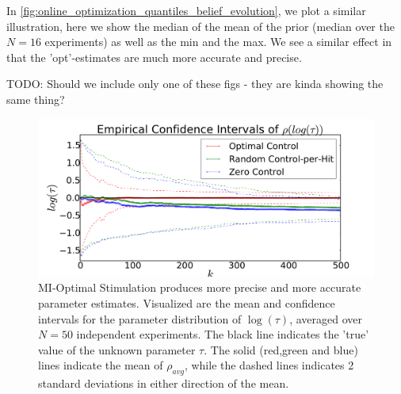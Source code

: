 In \cref{fig:online_optimization_quantiles_belief_evolution}, we plot a similar
illustration, here we show the median of the mean of the prior (median over the
$N=16$ experiments) as well as the min and the max. We see a similar effect in
that the 'opt'-estimates are much more accurate and precise. 

TODO: Should we include only one of these figs - they are kinda showing the
same thing?
 
\begin{figure}[htp]
\begin{center}
  \includegraphics[width=\textwidth]{Figs/HTOnlineEstimator/online_updated_prior_mean_aggregated_ensemble.pdf}
  \caption[MI-Optimal Stimulation produces more precise parameter estimates]
  {MI-Optimal Stimulation produces more precise and more accurate parameter
  estimates. Visualized are the mean and confidence intervals for the parameter
  distribution of $\log (\tau)$, averaged over $N=50$ independent
  experiments. The black line indicates the 'true' value of the unknown parameter $\tau$.
  The solid (red,green and blue) lines indicate the mean of $\rho_{avg}$, while
  the dashed lines indicates 2 standard deviations in either direction of the
  mean. }  
  \label{fig:online_optimization_aggregated_belief_evolution}
\end{center}
\end{figure}

